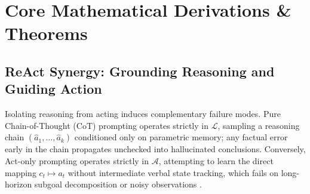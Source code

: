 \documentclass[../../../../master.tex]{subfiles}
\begin{document}
\section{Core Mathematical Derivations \& Theorems}
\label{sec:agent:derivations}

\subsection{ReAct Synergy: Grounding Reasoning and Guiding Action}

Isolating reasoning from acting induces complementary failure modes. Pure Chain-of-Thought (CoT) prompting operates strictly in $\mathcal{L}$, sampling a reasoning chain $(\hat{a}_1, \dots, \hat{a}_k)$ conditioned only on parametric memory; any factual error early in the chain propagates unchecked into hallucinated conclusions. Conversely, Act-only prompting operates strictly in $\mathcal{A}$, attempting to learn the direct mapping $c_t \mapsto a_t$ without intermediate verbal state tracking, which fails on long-horizon subgoal decomposition or noisy observations .
\end{document}

